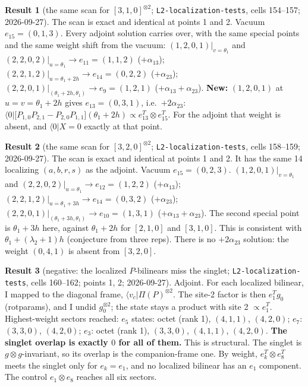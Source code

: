 \documentclass[11pt]{article}
\newcommand{\nb}[1]{\texttt{#1}}
\theoremstyle{definition}
\newtheorem{result}{Result}
\theoremstyle{remark}
\begin{document}
\begin{result}[{the same scan for $[3,1,0]^{\otimes2}$}; \nb{L2-localization-tests}, cells 154--157; 2026-09-27]
The scan is exact and identical at points 1 and 2. Vacuum $e_{15}=(0,1,3)$. Every adjoint solution carries over, with the same special points and the same weight shift from the vacuum:
$(1,2,0,1)|_{v=\theta_1}$ and $(2,2,0,2)|_{u=\theta_1}\to e_{11}=(1,1,2)$ ($+\alpha_{13}$);
$(2,2,1,2)|_{u=\theta_1+2h}\to e_{14}=(0,2,2)$ ($+\alpha_{23}$);
$(2,2,0,1)|_{(\theta_1+2h,\theta_1)}\to e_9=(1,2,1)$ ($+\alpha_{13}+\alpha_{23}$).
\textbf{New:} $(1,2,0,1)$ at $u=v=\theta_1+2h$ gives $e_{13}=(0,3,1)$, i.e.\ $+2\alpha_{23}$:
$\langle0|\big[P_{1,0}P_{2,1}-P_{2,0}P_{1,1}\big](\theta_1{+}2h)\propto e_{13}^T\otimes e_{15}^T$.
For the adjoint that weight is absent, and $\langle0|X=0$ exactly at that point.
\end{result}

\begin{result}[{the same scan for $[3,2,0]^{\otimes2}$}; \nb{L2-localization-tests}, cells 158--159; 2026-09-27]
The scan is exact and identical at points 1 and 2. It has the same 14 localizing $(a,b,r,s)$ as the adjoint. Vacuum $e_{15}=(0,2,3)$.
$(1,2,0,1)|_{v=\theta_1}$ and $(2,2,0,2)|_{u=\theta_1}\to e_{12}=(1,2,2)$ ($+\alpha_{13}$);
$(2,2,1,2)|_{u=\theta_1+3h}\to e_{14}=(0,3,2)$ ($+\alpha_{23}$);
$(2,2,0,1)|_{(\theta_1+3h,\theta_1)}\to e_{10}=(1,3,1)$ ($+\alpha_{13}+\alpha_{23}$).
The second special point is $\theta_1+3h$ here, against $\theta_1+2h$ for $[2,1,0]$ and $[3,1,0]$. This is consistent with $\theta_1+(\lambda_2+1)h$ (conjecture from three reps).
There is no $+2\alpha_{23}$ solution: the weight $(0,4,1)$ is absent from $[3,2,0]$.
\end{result}

\begin{result}[negative: the localized $P$-bilinears miss the singlet; \nb{L2-localization-tests}, cells 160--162; points 1, 2; 2026-09-27]
Adjoint. For each localized bilinear, I mapped to the diagonal frame, $\langle v_c|\Pi(P)^{\otimes2}$. The site-2 factor is then $e_1^Tg_0$ (rotparams), and I undid $g_0^{\otimes2}$; the state stays a product with site 2 $\propto e_1^T$. Highest-weight sectors reached:
$e_5$ states: octet (rank 1), $(4,1,1)$, $(4,2,0)$;
$e_7$: $(3,3,0)$, $(4,2,0)$;
$e_3$: octet (rank 1), $(3,3,0)$, $(4,1,1)$, $(4,2,0)$.
\textbf{The singlet overlap is exactly $0$ for all of them.} This is structural. The singlet is $g\otimes g$-invariant, so its overlap is the companion-frame one. By weight, $e_k^T\otimes e_8^T$ meets the singlet only for $e_k=e_1$, and no localized bilinear has an $e_1$ component. The control $e_1\otimes e_8$ reaches all six sectors.
\end{result}
\end{document}
